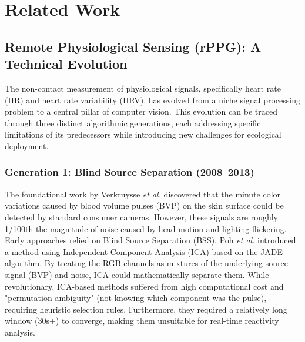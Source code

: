 \documentclass[journal]{IEEEtran}
\newcommand{\etal}{\textit{et al.}}
\begin{document}
\section{Related Work}

\subsection{Remote Physiological Sensing (rPPG): A Technical Evolution}
The non-contact measurement of physiological signals, specifically heart rate (HR) and heart rate variability (HRV),
has evolved from a niche signal processing problem to a central pillar of computer vision.
This evolution can be traced through three distinct algorithmic generations, each addressing specific limitations of its predecessors
while introducing new challenges for ecological deployment.

\subsubsection{Generation 1: Blind Source Separation (2008--2013)}
The foundational work by Verkruysse \etal \cite{verkruysse2008} discovered that the minute color variations caused by blood volume pulses (BVP)
on the skin surface could be detected by standard consumer cameras.
However, these signals are roughly 1/100th the magnitude of noise caused by head motion and lighting flickering.
Early approaches relied on Blind Source Separation (BSS). Poh \etal \cite{poh_ica} introduced a method using Independent Component Analysis (ICA)
based on the JADE algorithm. By treating the RGB channels as mixtures of the underlying source signal (BVP) and noise,
ICA could mathematically separate them. While revolutionary, ICA-based methods suffered from high computational cost and "permutation ambiguity"
(not knowing which component was the pulse), requiring heuristic selection rules.
Furthermore, they required a relatively long window (30s+) to converge, making them unsuitable for real-time reactivity analysis.
\end{document}
